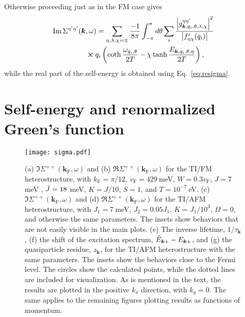 \documentclass[aps, prb, twocolumn,amsmath,amssymb,floatfix]{revtex4-2}
\begin{document}
Otherwise proceeding just as in the FM case gives
\begin{align}
\label{eq:numericimsigmaAFM}
    \Im\Sigma^{\eta'\eta'}(\boldsymbol{k}&, \omega) = \sum_{\eta, \lambda, \chi = \pm}\frac{-1}{8\pi}\int_{-\pi}^\pi d\theta  \sum_{i} \frac{\abs{g_{\boldsymbol{k}, q_i, \theta, \lambda, \chi}^{\eta\eta'}}^2 }{\abs{f_{\eta\chi}'(q_i)}} \nonumber \\
    &\cross q_i\left(\coth\frac{\omega_{q_i,\theta}}{2T}-\chi \tanh\frac{E_{\boldsymbol{k},q_i, \theta, \eta}}{2T}\right),
\end{align}
while the real part of the self-energy is obtained using Eq.~\eqref{eq:resigma}.



\section{Self-energy and renormalized Green's function} \label{sec:Results}

\begin{figure*}
    \centering
    \texttt{[image: sigma.pdf]}
    \caption{(a) $\Im\Sigma^{++}(\boldsymbol{k}_{\textrm{F}}, \omega)$ and (b) $\Re\Sigma^{++}(\boldsymbol{k}_{\textrm{F}}, \omega)$ for the TI/FM heterostructure, with $k_{\textrm{F}} = \pi/12$, $v_{\textrm{F}} = 429~$meV, $W=0.3v_{\textrm{F}}$, $J = 7~$meV , $\Bar{J} = 18~$meV, $K = J/10$, $S=1$, and $T=10^{-7}~$eV. (c) $\Im\Sigma^{++}(\boldsymbol{k}_{\textrm{F}}, \omega)$ and (d) $\Re\Sigma^{++}(\boldsymbol{k}_{\textrm{F}}, \omega)$ for the TI/AFM heterostructure, with $J_1 = 7~$meV,  $J_2 = 0.05 J_1$, $K = J_1/10^3$, $\Omega = 0$, and otherwise the same parameters. The insets show behaviors that are not easily visible in the main plots. (e) The inverse lifetime, $1/\tau_{\boldsymbol{k}}$, (f) the shift of the excitation spectrum, $\Tilde{E}_{\boldsymbol{k}+}-E_{\boldsymbol{k}+}$, and (g) the quasiparticle residue, $z_{\boldsymbol{k}}$, for the TI/AFM heterostructure with the same parameters. The insets show the behaviors close to the Fermi level. The circles show the calculated points, while the dotted lines are included for visualization. As is mentioned in the text, the results are plotted in the positive $k_x$ direction, with $k_y = 0$. The same applies to the remaining figures plotting results as functions of momentum.}
    \label{fig:sigma}
\end{figure*}
\end{document}
